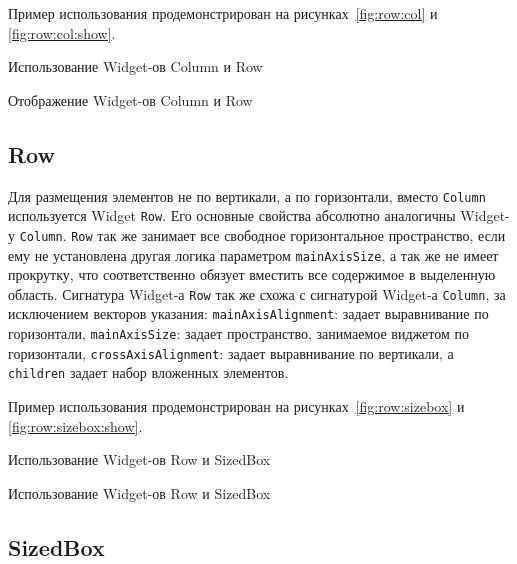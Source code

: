 Пример использования продемонстрирован
на рисунках~\ref{fig:row:col} и \ref{fig:row:col:show}.

\begin{image}
	\caption{Использование Widget-ов Column и Row}
	\label{fig:row:col}
\end{image}

\begin{image}
	\caption{Отображение Widget-ов Column и Row}
	\label{fig:row:col:show}
\end{image}

\subsection{Row}

Для размещения элементов не по вертикали, а по горизонтали,
вместо \texttt{Column} используется Widget \texttt{Row}.
Его основные свойства абсолютно аналогичны Widget-у \texttt{Column}.
\texttt{Row} так же занимает все свободное горизонтальное пространство,
если ему не установлена другая логика параметром \texttt{mainAxisSize},
а так же не имеет прокрутку,
что соответственно обязует вместить все содержимое в выделенную область.
Сигнатура Widget-а \texttt{Row} так же схожа
с сигнатурой Widget-а \texttt{Column},
за исключением векторов указания:
\texttt{mainAxisAlignment}: задает выравнивание по горизонтали,
\texttt{mainAxisSize}: задает пространство, занимаемое виджетом по горизонтали,
\texttt{crossAxisAlignment}: задает выравнивание по вертикали,
а \texttt{children} задает набор вложенных элементов.

Пример использования продемонстрирован
на рисунках~\ref{fig:row:sizebox} и \ref{fig:row:sizebox:show}.

\begin{image}
	\caption{Использование Widget-ов Row и SizedBox}
	\label{fig:row:sizebox}
\end{image}

\begin{image}
	\caption{Использование Widget-ов Row и SizedBox}
	\label{fig:row:sizebox:show}
\end{image}

\subsection{SizedBox}


